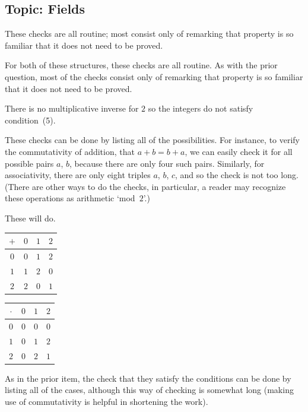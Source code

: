 \subsection{Topic: Fields}
\begin{ans}{1}
      These checks are all routine; most consist only of remarking that
      property is so familiar that it does not need to be proved.
    
\end{ans}
\begin{ans}{2}
      For both of these structures, these checks are all routine.
      As with the prior question, most of the checks consist only of remarking
      that property is so familiar that it does not need to be proved.
    
\end{ans}
\begin{ans}{3}
       There is no multiplicative inverse for $2$ so the integers do not
       satisfy condition~(5).
     
\end{ans}
\begin{ans}{4}
       These checks can be done by listing all of the possibilities.
       For instance, to verify the commutativity of addition, that $a+b=b+a$,
       we can easily check it for all possible pairs $a$, $b$, because there
       are only four such pairs.
       Similarly, for associativity, there are only eight triples $a$, $b$,
       $c$, and so the check is not too long.
       (There are other ways to do the checks, in particular, a reader may
       recognize these operations as arithmetic `mod~$2$'.)
     
\end{ans}
\begin{ans}{5}
       These will do.
       \begin{center}
          \begin{tabular}{c|ccc}
             \( + \) &\( 0 \) &\( 1 \) &$2$ \\
             \hline
             \( 0 \) &\( 0 \) &\( 1 \) &$2$ \\
             \( 1 \) &\( 1 \) &\( 2 \) &$0$ \\
             $2$     &$2$     &$0$     &$1$
          \end{tabular}
          \qquad
          \begin{tabular}{c|ccc}
            \( \cdot \) &\( 0 \) &\( 1 \) &$2$ \\
            \hline
            \( 0 \)  &\( 0 \) &\( 0 \) &$0$ \\
            \( 1 \)  &\( 0 \) &\( 1 \) &$2$ \\
            $2$      &$0$     &$2$     &$1$
          \end{tabular}
       \end{center}
       As in the prior item, the check that they satisfy the conditions can
       be done by listing all of the cases, although this way of checking is
       somewhat long (making use of commutativity is helpful in
       shortening the work).
     
\end{ans}
